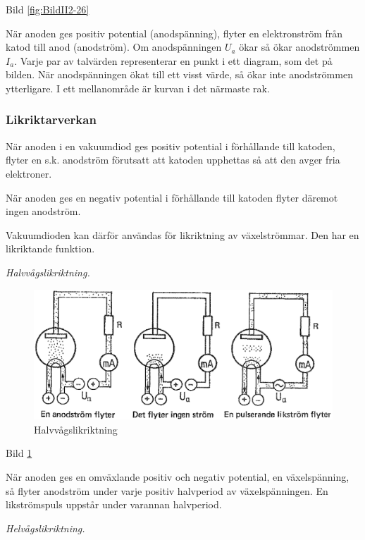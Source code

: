 Bild \ref{fig:BildII2-26}

När anoden ges positiv potential (anodspänning), flyter en elektronström från
katod till anod (anodström). Om anodspänningen \(U_a\) ökar så ökar anodströmmen
\(I_a\). Varje par av talvärden representerar en punkt i ett diagram, som det på
bilden. När anodspänningen ökat till ett visst värde, så ökar inte anodströmmen
ytterligare. I ett mellanområde är kurvan
i det närmaste rak.

\subsubsection{Likriktarverkan}

När anoden i en vakuumdiod ges positiv potential i förhållande till katoden,
flyter en s.k. anodström förutsatt att katoden upphettas så att den avger fria
elektroner.

När anoden ges en negativ potential i förhållande till katoden flyter däremot
ingen anodström.

Vakuumdioden kan därför användas för likriktning av växelströmmar. Den har en
likriktande funktion.

\emph{Halvvågslikriktning.}

\begin{figure}
\includegraphics[width=\textwidth]{images/bild_2_2-27.png}
\caption{Halvvågslikriktning}
\label{fig:BildII2-27}
\end{figure}

Bild \ref{fig:BildII2-27}

När anoden ges en omväxlande positiv och negativ potential, en växelspänning, så
flyter anodström under varje positiv halvperiod av växelspänningen. En
likströmspuls uppstår under varannan halvperiod.

\emph{Helvågslikriktning.}

